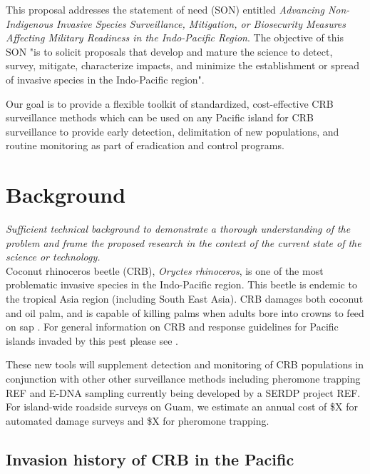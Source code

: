\documentclass[11pt,english,letterpaper]{scrartcl}
\begin{document}
This proposal addresses the statement of need (SON) entitled \textit{Advancing Non-Indigenous Invasive Species Surveillance, Mitigation, or Biosecurity Measures Affecting Military Readiness in the Indo-Pacific Region}. The objective of this SON "is to solicit proposals that develop and mature the science to detect, survey, mitigate, characterize impacts, and minimize the establishment or spread of invasive species in the Indo-Pacific region".
	
Our goal is to provide a flexible toolkit of standardized, cost-effective CRB surveillance methods which can be used on any Pacific island for CRB surveillance to provide early detection, delimitation of new populations, and routine monitoring as part of eradication and control programs. 

\section{Background}


\textit{Sufficient technical background to demonstrate a thorough understanding of the problem and frame the proposed research in the context of the current state of the science or technology.}\\

Coconut rhinoceros beetle (CRB), \textit{Oryctes rhinoceros}, is one of the most problematic invasive species in the Indo-Pacific region. This beetle is endemic to the tropical Asia region (including South East Asia). CRB damages both coconut and oil palm, and is capable of killing palms when adults bore into crowns to feed on sap \cite{Bedford2013a, Bedford2013b}. For general information on CRB and response guidelines for Pacific islands invaded by this pest please see \cite{Pallipparambil2015,Jackson2020,Moore2023}. 

These new tools will supplement detection and monitoring of CRB populations in conjunction with other other surveillance methods including pheromone trapping REF and E-DNA sampling currently being developed by a SERDP project REF. For island-wide roadside surveys on Guam, we estimate an annual cost of \$X for automated damage surveys and \$X for pheromone trapping. 

\subsection{Invasion history of CRB in the Pacific}
\end{document}
